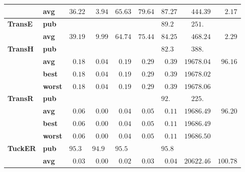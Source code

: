 \begin{tabular}{llrrrrrrr}
       & \textbf{avg} &            $36.22$ &  $\phantom{0}3.94$ &            $65.63$ &            $79.64$ &            $87.27$ &            $\phantom{00}444.39$ &  $\phantom{00}2.17$ \\\midrule
\textbf{TransE} & \textbf{pub} &                    &                    &                    &                    &  $89.2\phantom{0}$ &  $\phantom{00}251.\phantom{00}$ &                     \\
       & \textbf{avg} &            $39.19$ &  $\phantom{0}9.99$ &            $64.74$ &            $75.44$ &            $84.25$ &            $\phantom{00}468.24$ &  $\phantom{00}2.29$ \\\midrule
\textbf{TransH} & \textbf{pub} &                    &                    &                    &                    &  $82.3\phantom{0}$ &  $\phantom{00}388.\phantom{00}$ &                     \\
       & \textbf{avg} &  $\phantom{0}0.18$ &  $\phantom{0}0.04$ &  $\phantom{0}0.19$ &  $\phantom{0}0.29$ &  $\phantom{0}0.39$ &                      $19678.04$ &  $\phantom{0}96.16$ \\
       & \textbf{best} &  $\phantom{0}0.18$ &  $\phantom{0}0.04$ &  $\phantom{0}0.19$ &  $\phantom{0}0.29$ &  $\phantom{0}0.39$ &                      $19678.02$ &                     \\
       & \textbf{worst} &  $\phantom{0}0.18$ &  $\phantom{0}0.04$ &  $\phantom{0}0.19$ &  $\phantom{0}0.29$ &  $\phantom{0}0.39$ &                      $19678.06$ &                     \\\midrule
\textbf{TransR} & \textbf{pub} &                    &                    &                    &                    &  $92.\phantom{00}$ &  $\phantom{00}225.\phantom{00}$ &                     \\
       & \textbf{avg} &  $\phantom{0}0.06$ &  $\phantom{0}0.00$ &  $\phantom{0}0.04$ &  $\phantom{0}0.05$ &  $\phantom{0}0.11$ &                      $19686.49$ &  $\phantom{0}96.20$ \\
       & \textbf{best} &  $\phantom{0}0.06$ &  $\phantom{0}0.00$ &  $\phantom{0}0.04$ &  $\phantom{0}0.05$ &  $\phantom{0}0.11$ &                      $19686.49$ &                     \\
       & \textbf{worst} &  $\phantom{0}0.06$ &  $\phantom{0}0.00$ &  $\phantom{0}0.04$ &  $\phantom{0}0.05$ &  $\phantom{0}0.11$ &                      $19686.50$ &                     \\\midrule
\textbf{TuckER} & \textbf{pub} &  $95.3\phantom{0}$ &  $94.9\phantom{0}$ &  $95.5\phantom{0}$ &                    &  $95.8\phantom{0}$ &                                 &                     \\
       & \textbf{avg} &  $\phantom{0}0.03$ &  $\phantom{0}0.00$ &  $\phantom{0}0.02$ &  $\phantom{0}0.03$ &  $\phantom{0}0.04$ &                      $20622.46$ &            $100.78$ \\
\bottomrule
\end{tabular}

